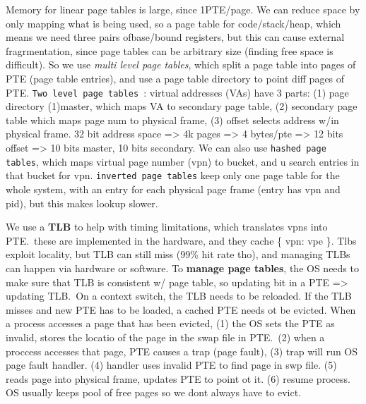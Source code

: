 Memory for linear page tables is large, since 1PTE/page. We can reduce space by
only mapping what is being used, so a page table for code/stack/heap, which
means we need three pairs ofbase/bound registers, but this can cause external
fragrmentation, since page tables can be arbitrary size (finding free space is
difficult). So we use {\it multi level page tables}, which split a page table
into pages of PTE (page table entries), and use a page table directory to point
diff pages of PTE. {\tt Two level page tables }: virtual addresses (VAs) have 3
parts: (1) page directory (1)master, which maps VA to secondary page table, (2) secondary
page table which maps page num to physical frame, (3) offset selects address
w/in physical frame. 32 bit address space => 4k pages => 4 bytes/pte => 12 bits
offset => 10 bits master, 10 bits secondary. We can also use {\tt hashed page
tables}, which maps virtual page number (vpn) to bucket, and u search entries
in that bucket for vpn. {\tt inverted page tables} keep only one page table for
the whole system, with an entry for each physical page frame (entry has vpn and
pid), but this makes lookup slower.

We use a {\bf TLB} to help with timing limitations, which translates vpns into
PTE.\ these are implemented in the hardware, and they cache \{ vpn: vpe \}. Tlbs
exploit locality, but TLB can still miss (99\% hit rate tho), and managing TLBs
can happen via hardware or software. To {\bf manage page tables}, the OS needs
to make sure that TLB is consistent w/ page table, so updating bit in a PTE =>
updating TLB.\ On a context switch, the TLB needs to be reloaded. If the TLB
misses and new PTE has to be loaded, a cached PTE needs ot be evicted. When a
process accesses a page that has been evicted, (1) the OS sets the PTE as
invalid, stores the locatio of the page in the swap file in PTE.\ (2) when a
proccess accesses that page, PTE causes a trap (page fault), (3) trap will run
OS page fault handler. (4) handler uses invalid PTE to find page in swp file.
(5) reads page into physical frame, updates PTE to point ot it. (6) resume
process. OS usually keeps pool of free pages so we dont always have to evict.
